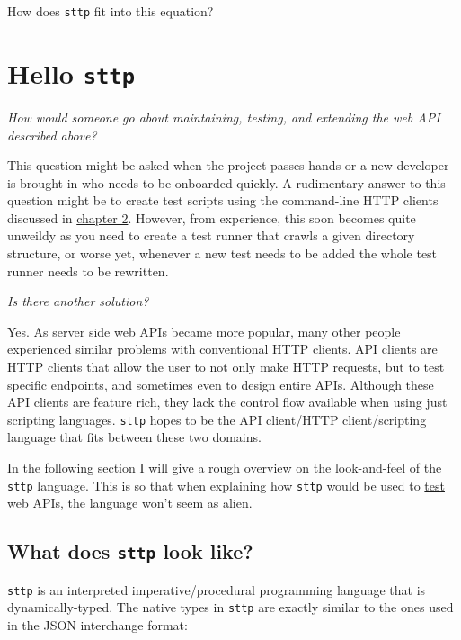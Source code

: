 \documentclass[]{full}
\theoremstyle{definition}
\begin{document}
How does \verb|sttp| fit into this equation?

\cprotect\chapter{Hello \verb|sttp|}

\begin{center}
    \textit{How would someone go about maintaining, testing, and extending the web API described above?}
\end{center}

This question might be asked when the project passes hands or a new developer is brought in who needs to be onboarded quickly. A rudimentary answer to this question might be to create test scripts using the command-line HTTP clients discussed in \hyperref[sec:meet-sttp-http-clients]{chapter 2}. However, from experience, this soon becomes quite unweildy as you need to create a test runner that crawls a given directory structure, or worse yet, whenever a new test needs to be added the whole test runner needs to be rewritten.

\begin{center}
    \textit{Is there another solution?}
\end{center}

Yes. As server side web APIs became more popular, many other people experienced similar problems with conventional HTTP clients. API clients are HTTP clients that allow the user to not only make HTTP requests, but to test specific endpoints, and sometimes even to design entire APIs. Although these API clients are feature rich, they lack the control flow available when using just scripting languages. \verb|sttp| hopes to be the API client/HTTP client/scripting language that fits between these two domains.

In the following section I will give a rough overview on the look-and-feel of the \verb|sttp| language. This is so that when explaining how \verb|sttp| would be used to \hyperref[sec:hello-sttp-using-sttp-to-test]{test web APIs}, the language won't seem as alien.

\cprotect\section{What does \verb|sttp| look like?}

\verb|sttp| is an interpreted imperative/procedural programming language that is dynamically-typed. The native types in \verb|sttp| are exactly similar to the ones used in the JSON interchange format:
\end{document}
